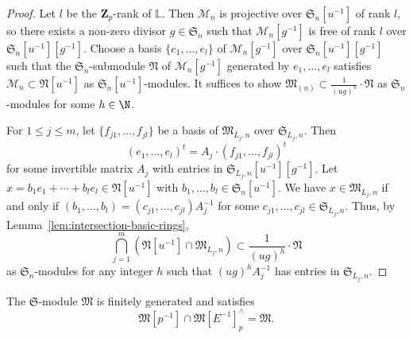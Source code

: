 \begin{proof}
Let $l$ be the $\mathbf{Z}_p$-rank of $\mathbb{L}$. Then $\mathcal{M}_n$ is projective over $\mathfrak{S}_n [u^{-1}]$ of rank $l$, so there exists a non-zero divisor $g \in \mathfrak{S}_n$ such that $\mathcal{M}_n [g^{-1}]$ is free of rank $l$ over $\mathfrak{S}_n [u^{-1}][g^{-1}]$. Choose a basis $\{e_1, \ldots, e_{l}\}$ of $\mathcal{M}_n[g^{-1}]$ over $\mathfrak{S}_n[u^{-1}][g^{-1}]$ such that the $\mathfrak{S}_n$-submodule $\mathfrak{N}$ of $\mathcal{M}_n[g^{-1}]$ generated by $e_1, \ldots, e_{l}$ satisfies $\mathcal{M}_n \subset \mathfrak{N}[u^{-1}]$ as $\mathfrak{S}_n[u^{-1}]$-modules. It suffices to show $\mathfrak{M}_{(n)} \subset \frac{1}{(ug)^h}\cdot \mathfrak{N}$ as $\mathfrak{S}_n$-modules for some $h\in\N$.

For $1 \leq j \leq m$, let $\{f_{j1}, \ldots, f_{jl}\}$ be a basis of $\mathfrak{M}_{L_j, n}$ over $\mathfrak{S}_{L_j, n}$. Then
\[
(e_1, \ldots, e_{l})^t = A_j\cdot (f_{j1}, \ldots, f_{jl})^t
\]
for some invertible matrix $A_j$ with entries in $\mathfrak{S}_{L_j, n}[u^{-1}][g^{-1}]$. Let $x = b_1 e_1+\cdots+b_{l} e_{l} \in \mathfrak{N}[u^{-1}]$ with $b_1, \ldots, b_{l} \in \mathfrak{S}_n[u^{-1}]$. We have $x \in \mathfrak{M}_{L_j, n}$ if and only if $(b_1, \ldots, b_{l}) = (c_{j1}, \ldots, c_{jl})A_j^{-1}$ for some $c_{j1}, \ldots, c_{jl} \in \mathfrak{S}_{L_j, n}$. Thus, by Lemma~\ref{lem:intersection-basic-rings}, 
\[
\bigcap_{j=1}^m (\mathfrak{N}[u^{-1}] \cap \mathfrak{M}_{L_j, n}) \subset \frac{1}{(ug)^h}\cdot \mathfrak{N}
\]
as $\mathfrak{S}_n$-modules for any integer $h$ such that $(ug)^hA_j^{-1}$ has entries in $\mathfrak{S}_{L_j, n}$.
\end{proof}

\begin{prop} \label{prop:kisin-mod-finitely-generated-saturated}
The $\mathfrak{S}$-module $\mathfrak{M}$ is finitely generated and satisfies 
\[
\mathfrak{M}[p^{-1}] \cap \mathfrak{M}[E^{-1}]^{\wedge}_p = \mathfrak{M}.
\]
\end{prop}

